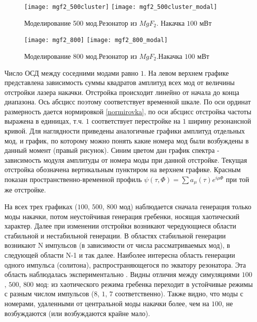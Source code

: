 \begin{figure}
  \texttt{[image: mgf2\_500cluster]}
  \texttt{[image: mgf2\_500cluster\_modal]}
  \caption{Моделирование 500 мод.Резонатор из $MgF_2$. Накачка $100$ мВт} \label{500modes}
\end{figure}

\begin{figure}
  \texttt{[image: mgf2\_800]}
  \texttt{[image: mgf2\_800\_modal]}
  \caption{Моделирование 800 мод.Резонатор из $MgF_2$.Накачка $100$ мВт} \label{800modes}
\end{figure}

Число ОСД между соседними модами равно $1$. На левом верхнем графике представлена зависимость суммы квадратов амплитуд всех мод от величины отстройки лазера накачки. Отстройка происходит линейно от начала до конца диапазона. Ось абсцисс поэтому соответствует временной шкале.  По оси ординат размерность дается нормировкой \eqref{normirovka}, по оси абсцисс отстройка частоты выражена в единицах, т.ч. $1$ соответствует перестройке на $1$ ширину резонансной кривой. Для наглядности приведены аналогичные графики амплитуд отдельных мод, и график, по которому можно понять какие номера мод были возбуждены в данный момент (правый рисунок). Синим цветом дан график спектра - зависимость модуля амплитуды от номера моды при данной отстройке. Текущая отстройка обозначена вертикальным пунктиром на верхнем графике. Красным показан пространственно-временной профиль $\psi(\tau,\Phi)=\sum a_\mu(\tau)e^{i\mu\Phi}$ при той же отстройке.

На всех трех графиках ($100$, $500$, $800$ мод) наблюдается сначала генерация только моды накачки, потом неустойчивая генерация гребенки, носящая хаотический характер. Далее при изменении отстройки возникают чередующиеся области стабильной и нестабильной генерации. В областях стабильной генерации возникают N импульсов (в зависимости от числа рассматриваемых мод), в следующей области N-1 и так далее. Наиболее интересна область генерации одного импульса (солитона), распространяющегося по экватору резонатора. Эта область наблюдалась экспериментально \cite{mlg_to_nature}. Видны отличия между симуляциями $100$, $500$, $800$ мод: из хаотического режима гребенка переходит в устойчивые режимы с разным числом импульсов ($8$, $1$, $7$ соответственно). Также видно, что моды с номерами, удаленными от центральной моды накачки более, чем на $100$, не возбуждаются (или возбуждаются крайне мало).

